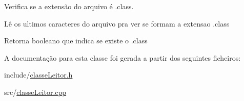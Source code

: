 Verifica se a extensão do arquivo é .class. 

Lê os ultimos caracteres do arquivo pra ver se formam a extensao .class \begin{DoxyReturn}{Retorna}
booleano que indica se existe o .class 
\end{DoxyReturn}


A documentação para esta classe foi gerada a partir dos seguintes ficheiros\+:\begin{DoxyCompactItemize}
\item 
include/\hyperlink{classeLeitor_8h}{classe\+Leitor.\+h}\item 
src/\hyperlink{classeLeitor_8cpp}{classe\+Leitor.\+cpp}\end{DoxyCompactItemize}
